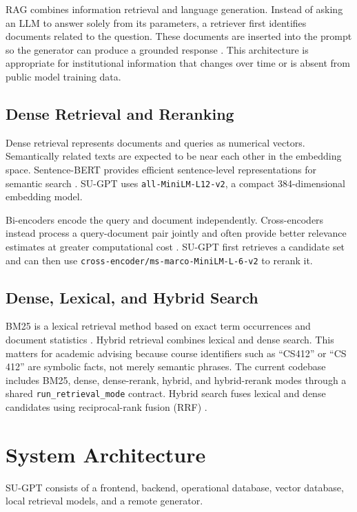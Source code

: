 \documentclass[10pt,a4paper]{article}
\newcommand{\code}[1]{\texttt{\small #1}}
\begin{document}
RAG combines information retrieval and language generation. Instead of asking an LLM to answer solely from its parameters, a retriever first identifies documents related to the question. These documents are inserted into the prompt so the generator can produce a grounded response \cite{lewis2020rag}. This architecture is appropriate for institutional information that changes over time or is absent from public model training data.

\subsection{Dense Retrieval and Reranking}

Dense retrieval represents documents and queries as numerical vectors. Semantically related texts are expected to be near each other in the embedding space. Sentence-BERT provides efficient sentence-level representations for semantic search \cite{reimers2019sentencebert}. SU-GPT uses \code{all-MiniLM-L12-v2}, a compact 384-dimensional embedding model.

Bi-encoders encode the query and document independently. Cross-encoders instead process a query-document pair jointly and often provide better relevance estimates at greater computational cost \cite{nogueira2019passage}. SU-GPT first retrieves a candidate set and can then use \code{cross-encoder/ms-marco-MiniLM-L-6-v2} to rerank it.

\subsection{Dense, Lexical, and Hybrid Search}

BM25 is a lexical retrieval method based on exact term occurrences and document statistics \cite{robertson2009bm25}. Hybrid retrieval combines lexical and dense search. This matters for academic advising because course identifiers such as ``CS412'' or ``CS 412'' are symbolic facts, not merely semantic phrases. The current codebase includes BM25, dense, dense-rerank, hybrid, and hybrid-rerank modes through a shared \code{run\_retrieval\_mode} contract. Hybrid search fuses lexical and dense candidates using reciprocal-rank fusion (RRF) \cite{cormack2009rrf}.

\section{System Architecture}

SU-GPT consists of a frontend, backend, operational database, vector database, local retrieval models, and a remote generator.
\end{document}

